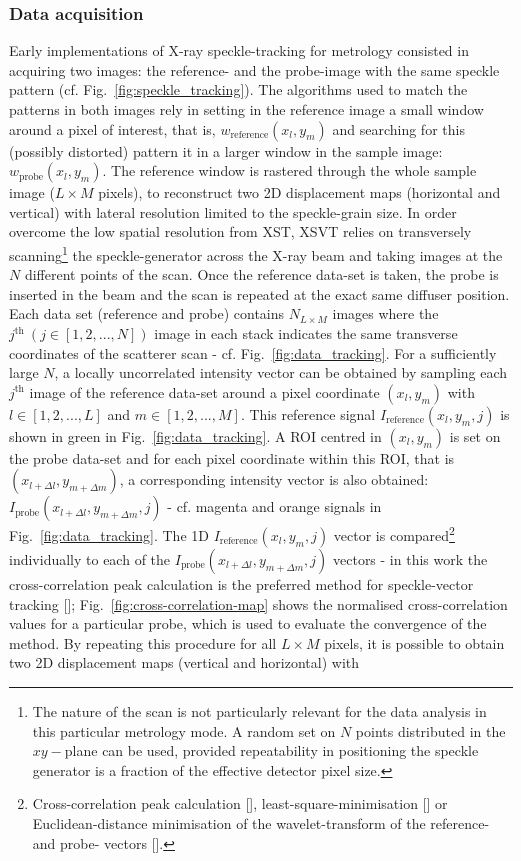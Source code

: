 \begin{refsection}
\subsubsection*{Data acquisition}

Early implementations of X-ray speckle-tracking for metrology consisted in acquiring two images: the reference- and the probe-image with the same speckle pattern (cf. Fig.~\ref{fig:speckle_tracking}). The algorithms used to match the patterns in both images rely in setting in the reference image a small window around a pixel of interest, that is, $w_\text{reference}(x_l,y_m)$ and searching for this (possibly distorted) pattern it in a larger window in the sample image: $w_\text{probe}(x_l,y_m)$. The reference window is rastered through the whole sample image ($L\times M$ pixels), to reconstruct two 2D displacement maps (horizontal and vertical) with lateral resolution limited to the speckle-grain size. In order overcome the low spatial resolution from XST, XSVT relies on transversely scanning\footnote{The nature of the scan is not particularly relevant for the data analysis in this particular metrology mode. A random set on $N$ points distributed in the $xy-$plane can be used, provided repeatability in positioning the speckle generator is a fraction of the effective detector pixel size.} the speckle-generator across the X-ray beam and taking images at the $N$ different points of the scan. Once the reference data-set is taken, the probe is inserted in the beam and the scan is repeated at the exact same diffuser position. Each data set (reference and probe) contains $N_{L\times M}$ images where the $j^\text{th}~(j\in[1,2,...,N])$ image in each stack indicates the same transverse coordinates of the scatterer scan - cf. Fig.~\ref{fig:data_tracking}. For a sufficiently large $N$, a locally uncorrelated intensity vector can be obtained by sampling each $j^\text{th}$ image of the reference data-set around a pixel coordinate $(x_l,y_m)$ with $l\in[1,2,...,L]$ and $m\in[1,2,...,M]$. This reference signal $I_{\text{reference}}(x_l,y_m,j)$ is shown in green in Fig.~\ref{fig:data_tracking}. A ROI centred in $(x_l,y_m)$ is set on the probe data-set and for each pixel coordinate within this ROI, that is $(x_{l+\Delta l},y_{m+\Delta m})$, a corresponding intensity vector is also obtained: $I_{\text{probe}}(x_{l+\Delta l},y_{m+\Delta m},j)$ - cf. magenta and orange signals in Fig.~\ref{fig:data_tracking}. The 1D $I_{\text{reference}}(x_l,y_m,j)$ vector is compared\footnote{Cross-correlation peak calculation [\cite{Berujon2012, Morgan2012}], least-square-minimisation [\cite{Zanette2014, Zdora2017}] or Euclidean-distance minimisation of the wavelet-transform of the reference- and probe- vectors [\cite{Qiao2020b}].} individually to each of the $I_{\text{probe}}(x_{l+\Delta l},y_{m+\Delta m},j)$ vectors - in this work the cross-correlation peak calculation is the preferred method for speckle-vector tracking [\cite{Berujon2012, Morgan2012}]; Fig.~\ref{fig:cross-correlation-map} shows the normalised cross-correlation values for a particular probe, which is used to evaluate the convergence of the method. By repeating this procedure for all $L\times M$ pixels, it is possible to obtain two 2D displacement maps (vertical and horizontal) with 
\end{refsection}
